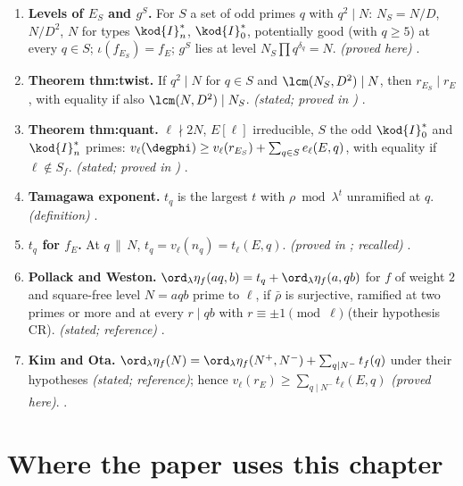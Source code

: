 \begin{enumerate}[label=\textbf{\thechapter.\arabic*}]
\item \textbf{Levels of $E_S$ and $g^S$.} For $S$ a set of odd primes $q$ with $q^2\mid N$: $N_S=N/D$, $N/D^2$, $N$ for types $\kod{I}_n^*$, $\kod{I}_0^*$, potentially good (with $q\ge5$) at
every $q\in S$; $\iota(f_{E_S})=f_E$; $g^S$ lies at level $N_S\prod q^{\delta_q}=N$.
\emph{(proved here)} .
\item \textbf{Theorem thm:twist.} If $q^2\mid N$ for $q\in S$ and $\lcm(N_S,D^2)\mid N$, then $r_{E_S}\mid r_E$, with equality if also $\lcm(N,D^2)\mid N_S$. \emph{(stated; proved in )}
.
\item \textbf{Theorem thm:quant.} $\ell\nmid2N$, $E[\ell]$ irreducible, $S$ the odd $\kod{I}_0^*$ and $\kod{I}_n^*$ primes: $v_\ell(\degphi)\ge v_\ell(r_{E_S})+\sum_{q\in S}e_\ell(E,q)$, with equality if $\ell\notin S_f$.
\emph{(stated; proved in )} .
\item \textbf{Tamagawa exponent.} $t_q$ is the largest $t$ with $\rho\bmod\lambda^t$ unramified at $q$. \emph{(definition)} .
\item \textbf{$t_q$ for $f_E$.} At $q\,\|\,N$, $t_q=v_\ell(n_q)=t_\ell(E,q)$. \emph{(proved in ; recalled)} .
\item \textbf{Pollack and Weston.} $\ord_\lambda\eta_f(aq,b)=t_q+\ord_\lambda\eta_f(a,qb)$ for $f$ of weight $2$ and square-free level $N=aqb$ prime to $\ell$, if $\bar\rho$ is
surjective, ramified at two primes or more and at every $r\mid qb$ with $r\equiv\pm1\pmod\ell$ (their hypothesis CR). \emph{(stated; reference)} .
\item \textbf{Kim and Ota.} $\ord_\lambda\eta_f(N)=\ord_\lambda\eta_f(N^+,N^-)+\sum_{q\mid N^-}t_f(q)$ under their hypotheses \emph{(stated; reference)}; hence $v_\ell(r_E)\ge\sum_{q\mid N^-}t_\ell(E,q)$
\emph{(proved here)}. .
\end{enumerate}

\section*{Where the paper uses this chapter}

